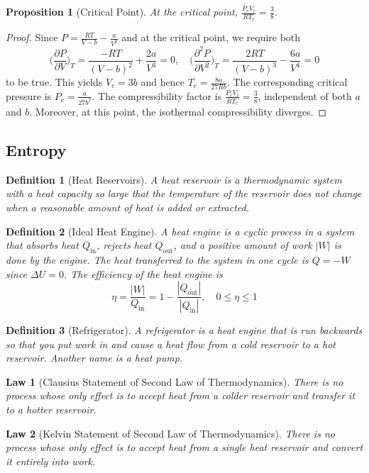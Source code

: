 \documentclass[a4paper]{article}
\theoremstyle{new}
\newtheorem{law}{Law}[section]
\newtheorem{defi}{Definition}[section]
\newtheorem{prop}{Proposition}[section]
\begin{document}
\begin{prop}[Critical Point]
At the critical point, $\frac{P_cV_c}{RT_c}=\frac{3}{8}$.
\end{prop}
\begin{proof}
Since $P=\frac{RT}{V-b}-\frac{a}{V^2}$ and at the critical point, we require both
$$\bigg(\frac{\partial P}{\partial V}\bigg)_T=\frac{-RT}{(V-b)^2}+\frac{2a}{V^3}=0,\quad \bigg(\frac{\partial^2 P}{\partial V^2}\bigg)_T=\frac{2RT}{(V-b)^3}-\frac{6a}{V^4}=0$$
to be true. This yields $V_c=3b$ and hence $T_c=\frac{8a}{27Rb}$. The corresponding critical pressure is $P_c=\frac{a}{27b^2}$. The compressibility factor is $\frac{P_cV_c}{RT_c}=\frac{3}{8}$, independent of both $a$ and $b$. Moreover, at this point, the isothermal compressibility diverges.
\end{proof}
\newpage
\subsection{Entropy}
\begin{defi}[Heat Reservoirs]
A heat reservoir is a thermodynamic system with a heat capacity so large that the temperature of the reservoir does not change when a reasonable amount of heat is added or extracted. 
\end{defi}
\begin{defi}[Ideal Heat Engine]
A heat engine is a cyclic process in a system that absorbs heat $Q_{\text{in}}$, rejects heat $Q_{\text{out}}$, and a positive amount of work $|W|$ is done by the engine. The heat transferred to the system in one cycle is $Q=-W$ since $\Delta U=0$. The efficiency of the heat engine is 
$$\eta=\frac{|W|}{Q_{\text{in}}}=1-\frac{|Q_{\text{out}}|}{|Q_{\text{in}}|},\quad0\leq\eta\leq 1$$
\end{defi}
\begin{defi}[Refrigerator]
A refrigerator is a heat engine that is run backwards so that you put work in and cause a heat flow from a cold reservoir to a hot reservoir. Another name is a heat pump.
\end{defi}
\begin{law}[Clausius Statement of Second Law of Thermodynamics]
There is no process whose only effect is to accept heat from a colder reservoir and transfer it to a hotter reservoir.
\end{law}
\begin{law}[Kelvin Statement of Second Law of Thermodynamics]
There is no process whose only effect is to accept heat from a single heat reservoir and convert it entirely into work.
\end{law}
\end{document}
